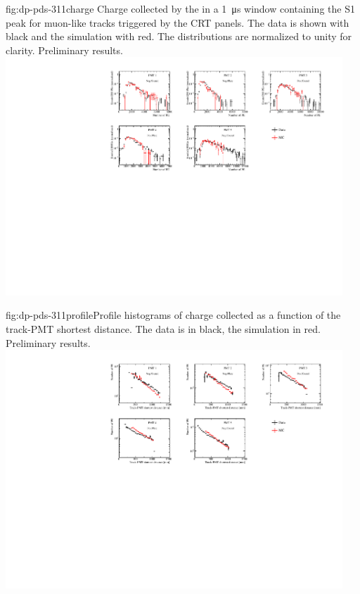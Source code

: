 \begin{dunefigure}{fig:dp-pds-311charge}{ Charge collected by the  in a \SI{1}{\us} window containing the S1 peak for muon-like tracks triggered by the CRT panels. The data is shown with black and the simulation with red. The distributions are normalized to unity for clarity. Preliminary results.}
\includegraphics[width=0.95\textwidth]{graphics/dppd_311_charge_mc_v2.pdf}
\end{dunefigure}

\begin{dunefigure}{fig:dp-pds-311profile}{Profile histograms of charge collected as a function of the track-PMT shortest distance. The data is in black, the simulation in red. Preliminary results.}
\includegraphics[width=0.95\textwidth]{graphics/dppd_311_charge_dist_mc.pdf}
\end{dunefigure}

